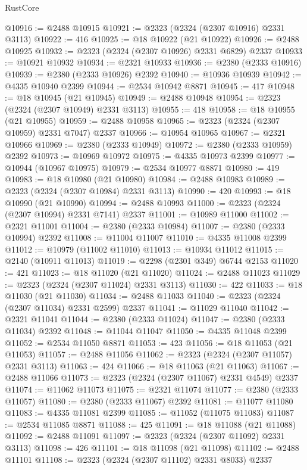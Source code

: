 \begin{lexlean}{RustCore}
\begin{coremodule}
@10916 := @2488 @10915
@10921 := @2323 (@2324 (@2307 @10916) @2331 @3113)
@10922 := 416
@10925 := @18 @10922 (@21 @10922)
@10926 := @2488 @10925
@10932 := @2323 (@2324 (@2307 @10926) @2331 @6829) @2337
@10933 := @10921 @10932
@10934 := @2321 @10933
@10936 := @2380 (@2333 @10916)
@10939 := @2380 (@2333 @10926) @2392
@10940 := @10936 @10939
@10942 := @4335 @10940 @2399
@10944 := @2534 @10942 @8871
@10945 := 417
@10948 := @18 @10945 (@21 @10945)
@10949 := @2488 @10948
@10954 := @2323 (@2324 (@2307 @10949) @2331 @3113)
@10955 := 418
@10958 := @18 @10955 (@21 @10955)
@10959 := @2488 @10958
@10965 := @2323 (@2324 (@2307 @10959) @2331 @7047) @2337
@10966 := @10954 @10965
@10967 := @2321 @10966
@10969 := @2380 (@2333 @10949)
@10972 := @2380 (@2333 @10959) @2392
@10973 := @10969 @10972
@10975 := @4335 @10973 @2399
@10977 := @10944 (@10967 @10975)
@10979 := @2534 @10977 @8871
@10980 := 419
@10983 := @18 @10980 (@21 @10980)
@10984 := @2488 @10983
@10989 := @2323 (@2324 (@2307 @10984) @2331 @3113)
@10990 := 420
@10993 := @18 @10990 (@21 @10990)
@10994 := @2488 @10993
@11000 := @2323 (@2324 (@2307 @10994) @2331 @7141) @2337
@11001 := @10989 @11000
@11002 := @2321 @11001
@11004 := @2380 (@2333 @10984)
@11007 := @2380 (@2333 @10994) @2392
@11008 := @11004 @11007
@11010 := @4335 @11008 @2399
@11012 := @10979 (@11002 @11010)
@11013 := @10934 @11012
@11015 := @2140 (@10911 @11013)
@11019 := @2298 (@2301 @349) @6744 @2153
@11020 := 421
@11023 := @18 @11020 (@21 @11020)
@11024 := @2488 @11023
@11029 := @2323 (@2324 (@2307 @11024) @2331 @3113)
@11030 := 422
@11033 := @18 @11030 (@21 @11030)
@11034 := @2488 @11033
@11040 := @2323 (@2324 (@2307 @11034) @2331 @2599) @2337
@11041 := @11029 @11040
@11042 := @2321 @11041
@11044 := @2380 (@2333 @11024)
@11047 := @2380 (@2333 @11034) @2392
@11048 := @11044 @11047
@11050 := @4335 @11048 @2399
@11052 := @2534 @11050 @8871
@11053 := 423
@11056 := @18 @11053 (@21 @11053)
@11057 := @2488 @11056
@11062 := @2323 (@2324 (@2307 @11057) @2331 @3113)
@11063 := 424
@11066 := @18 @11063 (@21 @11063)
@11067 := @2488 @11066
@11073 := @2323 (@2324 (@2307 @11067) @2331 @4549) @2337
@11074 := @11062 @11073
@11075 := @2321 @11074
@11077 := @2380 (@2333 @11057)
@11080 := @2380 (@2333 @11067) @2392
@11081 := @11077 @11080
@11083 := @4335 @11081 @2399
@11085 := @11052 (@11075 @11083)
@11087 := @2534 @11085 @8871
@11088 := 425
@11091 := @18 @11088 (@21 @11088)
@11092 := @2488 @11091
@11097 := @2323 (@2324 (@2307 @11092) @2331 @3113)
@11098 := 426
@11101 := @18 @11098 (@21 @11098)
@11102 := @2488 @11101
@11108 := @2323 (@2324 (@2307 @11102) @2331 @8033) @2337

\end{coremodule}
\end{lexlean}
